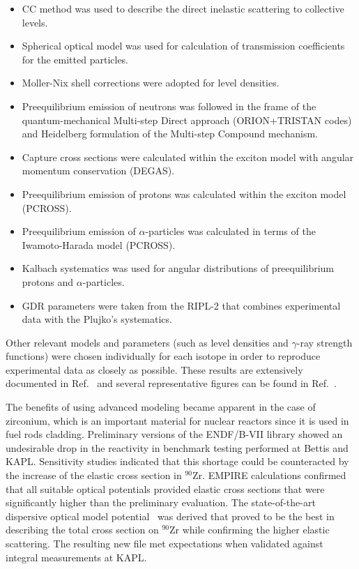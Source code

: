 \begin{itemize}
\item CC method was used to describe the direct inelastic scattering to
collective levels.

\item Spherical optical model was used for calculation of transmission
coefficients for the emitted particles.

\item Moller-Nix shell corrections were adopted for level densities.

\item Preequilibrium emission of neutrons was followed in the frame of the
quantum-mechanical Multi-step Direct approach (ORION+TRISTAN codes) and
Heidelberg formulation of the Multi-step Compound mechanism.

\item Capture cross sections were calculated within the exciton model with
angular momentum conservation (DEGAS).

\item Preequilibrium emission of protons was calculated within the exciton
model (PCROSS).

\item Preequilibrium emission of $\alpha$-particles was calculated in terms
of the Iwamoto-Harada model (PCROSS).

\item Kalbach systematics was used for angular distributions of
preequilibrium protons and $\alpha$-particles.

\item GDR parameters were taken from the RIPL-2 that combines experimental
data with the Plujko's systematics.
\end{itemize}

\noindent Other relevant models and parameters (such as level densities and $%
\gamma$-ray strength functions) were chosen individually for each isotope in
order to reproduce experimental data as closely as possible. These results
are extensively documented in Ref.~\cite{Kim:07} and several representative
figures can be found in Ref.~\cite{ENDF-VII}.

The benefits of using advanced modeling became apparent in the case of
zirconium, which is an important material for nuclear reactors since it is
used in fuel rods cladding. Preliminary versions of the ENDF/B-VII library
showed an undesirable drop in the reactivity in benchmark testing performed
at Bettis and KAPL. Sensitivity studies indicated that this shortage could
be counteracted by the increase of the elastic cross section in $^{90}$Zr.
EMPIRE calculations confirmed that all suitable optical potentials provided
elastic cross sections that were significantly higher than the preliminary
evaluation. The state-of-the-art dispersive optical model potential~\cite%
{Capote:06, Capote:05, Soukhovitskii:05} was derived that proved to be the
best in describing the total cross section on $^{90}$Zr while confirming the
higher elastic scattering. The resulting new file met expectations when
validated against integral measurements at KAPL.

